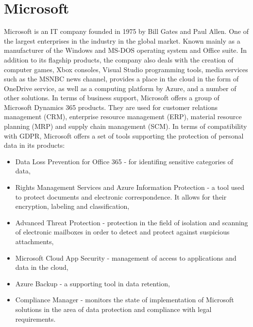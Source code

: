 \documentclass[en, noamssymb]{mgr}
\begin{document}
\section{Microsoft}

Microsoft is an IT company founded in 1975 by Bill Gates and Paul Allen. One of the largest enterprises in the industry in the global market. Known mainly as a manufacturer of the Windows and MS-DOS operating system and Office suite. In addition to its flagship products, the company also deals with the creation of computer games, Xbox consoles, Visual Studio programming tools, media services such as the MSNBC news channel, provides a place in the cloud in the form of OneDrive service, as well as a computing platform by Azure, and a number of other solutions. In terms of business support, Microsoft offers a group of Microsoft Dynamics 365 products. They are used for customer relations management (CRM), enterprise resource management (ERP), material resource planning (MRP) and supply chain management (SCM). In terms of compatibility with GDPR, Microsoft offers a set of tools supporting the protection of personal data in its products:

\begin{itemize}

\item Data Loss Prevention for Office 365 - for identifing sensitive categories of data,

\item Rights Management Services and Azure Information Protection - a tool used to protect documents and electronic correspondence. It allows for their encryption, labeling and classification,

\item Advanced Threat Protection - protection in the field of isolation and scanning of electronic mailboxes in order to detect and protect against suspicious attachments,

\item Microsoft Cloud App Security - management of access to applications and data in the cloud,

\item Azure Backup - a supporting tool in data retention,

\item Compliance Manager - monitors the state of implementation of Microsoft solutions in the area of data protection and compliance with legal requirements.

\end{itemize}
\end{document}
